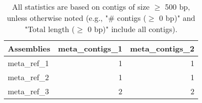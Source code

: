 \documentclass[12pt,a4paper]{article}
\begin{document}
\begin{table}[ht]
\begin{center}
\caption{All statistics are based on contigs of size $\geq$ 500 bp, unless otherwise noted (e.g., "\# contigs ($\geq$ 0 bp)" and "Total length ($\geq$ 0 bp)" include all contigs).}
\begin{tabular}{|l*{2}{|r}|}
\hline
Assemblies & meta\_contigs\_1 & meta\_contigs\_2 \\ \hline
meta\_ref\_1 & 1 & 1 \\ \hline
meta\_ref\_2 & 1 & 1 \\ \hline
meta\_ref\_3 & 2 & 2 \\ \hline
\end{tabular}
\end{center}
\end{table}
\end{document}
